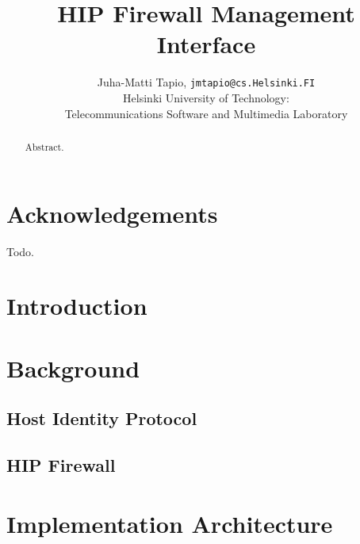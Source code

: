 \documentclass[a4paper,titlepage]{article}
\begin{document}
\title{HIP Firewall Management Interface}

\author{
	Juha-Matti Tapio, \texttt{jmtapio@cs.Helsinki.FI} \\
	Helsinki University of Technology: \\
	Telecommunications Software and Multimedia Laboratory}
\maketitle

\fancyhf{} %
\fancyfoot[C]{ \thepage }
\pagestyle{fancy}

\tableofcontents

\newpage

\section*{Acknowledgements}

Todo.

\newpage

\begin{abstract}

Abstract.

\end{abstract}

\clearpage


\section{Introduction}



\section{Background}

\subsection{Host Identity Protocol}

\subsection{HIP Firewall}



\section{Implementation Architecture}
\end{document}
